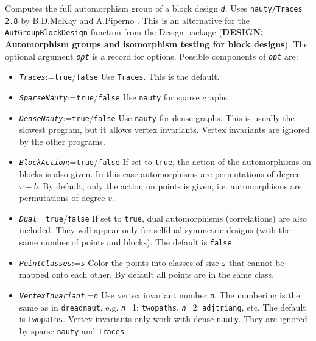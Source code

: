 \documentclass[a4paper,11pt]{report}
\begin{document}
{{{ Computes the full automorphism group of a block design \mbox{\texttt{\mdseries\slshape d}}. Uses \texttt{nauty/Traces 2.8} by B.D.McKay and A.Piperno \cite{MP14}. This is an alternative for the \texttt{AutGroupBlockDesign} function from the \textsf{Design} package  (\textbf{DESIGN: Automorphism groups and isomorphism testing for block designs}). The optional argument \mbox{\texttt{\mdseries\slshape opt}} is a record for options. Possible components of \mbox{\texttt{\mdseries\slshape opt}} are: 
\begin{itemize}
\item \mbox{\texttt{\mdseries\slshape Traces}}:=\texttt{true}/\texttt{false} Use \texttt{Traces}. This is the default.
\item \mbox{\texttt{\mdseries\slshape SparseNauty}}:=\texttt{true}/\texttt{false} Use \texttt{nauty} for sparse graphs.
\item \mbox{\texttt{\mdseries\slshape DenseNauty}}:=\texttt{true}/\texttt{false} Use \texttt{nauty} for dense graphs. This is usually the slowest program, but it allows vertex
invariants. Vertex invariants are ignored by the other programs.
\item \mbox{\texttt{\mdseries\slshape BlockAction}}:=\texttt{true}/\texttt{false} If set to \texttt{true}, the action of the automorphisms on blocks is also given. In this case
automorphisms are permutations of degree $v+b$. By default, only the action on points is given, i.e. automorphisms are
permutations of degree $v$.
\item \mbox{\texttt{\mdseries\slshape Dual}}:=\texttt{true}/\texttt{false} If set to \texttt{true}, dual automorphisms (correlations) are also included. They will appear only
for self\texttt{}dual symmetric designs (with the same number of
points and blocks). The default is \texttt{false}.
\item \mbox{\texttt{\mdseries\slshape PointClasses}}:=\mbox{\texttt{\mdseries\slshape s}} Color the points into classes of size \mbox{\texttt{\mdseries\slshape s}} that cannot be mapped onto each other. By default all points are in the same
class.
\item \mbox{\texttt{\mdseries\slshape VertexInvariant}}:=\mbox{\texttt{\mdseries\slshape n}} Use vertex invariant number \mbox{\texttt{\mdseries\slshape n}}. The numbering is the same as in \texttt{dreadnaut}, e.g. \mbox{\texttt{\mdseries\slshape n}}=1: \texttt{twopaths}, \mbox{\texttt{\mdseries\slshape n}}=2: \texttt{adjtriang}, etc. The default is \texttt{twopaths}. Vertex invariants only work with dense \texttt{nauty}. They are ignored by sparse \texttt{nauty} and \texttt{Traces}.

\end{itemize}}}}
\end{document}
